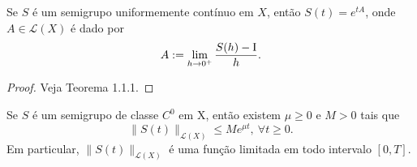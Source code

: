 \begin{proposition}
Se $S$ é um semigrupo uniformemente contínuo em $X$, então $S(t)=e^{tA}$,  onde $A\in \mathcal{L}(X)$ é dado por
\begin{equation*}
A:=\lim\limits_{h\to 0^+}\frac{S(h)-\operatorname{I}}{h}.
\end{equation*}
\end{proposition}
\begin{proof}
Veja \cite{gomes1985semigrupos}  Teorema 1.1.1.
\end{proof}


\begin{proposition}\label{exp}
    Se $S$ é um semigrupo de classe $C^0$ em X, então existem $\mu\geq 0$ e $M>0$ tais que 
    \begin{equation}\label{des.wT}
    \|S(t)\|_{\mathcal{L}(X)}\leq Me^{\mu t},\ \forall t\geq 0.  
    \end{equation}    
    Em particular, $\|S(t)\|_{\mathcal{L}(X)}$ é uma função limitada em todo intervalo $[0,T]$. 
\end{proposition}

